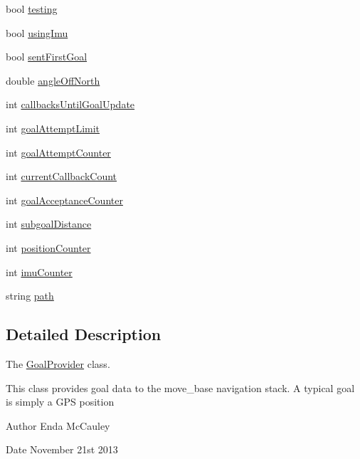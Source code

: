 \begin{DoxyCompactItemize}
\item 
bool \hyperlink{classGoalProvider_aefb932adf68011afd36e0796a001c147}{testing}
\item 
bool \hyperlink{classGoalProvider_a344bf023e320a812a824654c69531f31}{using\-Imu}
\item 
bool \hyperlink{classGoalProvider_aa576e5466ea93048ed6c231f226c9658}{sent\-First\-Goal}
\item 
double \hyperlink{classGoalProvider_a165b0eda7247ff32649b097a3e2d160a}{angle\-Off\-North}
\item 
int \hyperlink{classGoalProvider_a7ac4fe26923010d8bcb85fd50b90e259}{callbacks\-Until\-Goal\-Update}
\item 
int \hyperlink{classGoalProvider_ab63657ef75bd9c478d01b270a142103e}{goal\-Attempt\-Limit}
\item 
int \hyperlink{classGoalProvider_a35c75c0ef169d26dc40393e988f6f9ef}{goal\-Attempt\-Counter}
\item 
int \hyperlink{classGoalProvider_aca962edcdb380d56a7e551de7b5c36a6}{current\-Callback\-Count}
\item 
int \hyperlink{classGoalProvider_a27a290eb0662fbb7dc1dbe696f9fcb00}{goal\-Acceptance\-Counter}
\item 
int \hyperlink{classGoalProvider_ad4a03daf04350450ceee088c9f5f6c54}{subgoal\-Distance}
\item 
int \hyperlink{classGoalProvider_a9f314d13331aa611c5b96202742be0e9}{position\-Counter}
\item 
int \hyperlink{classGoalProvider_a1429bea432a6411c063cd3cf4990f1ca}{imu\-Counter}
\item 
string \hyperlink{classGoalProvider_a82146db14a5565a12fe979c68156d45c}{path}
\end{DoxyCompactItemize}


\subsection{\-Detailed \-Description}
\-The \hyperlink{classGoalProvider}{\-Goal\-Provider} class.

\-This class provides goal data to the move\-\_\-base navigation stack. \-A typical goal is simply a \-G\-P\-S position

\begin{DoxyAuthor}{\-Author}
\-Enda \-Mc\-Cauley 
\end{DoxyAuthor}
\begin{DoxyDate}{\-Date}
\-November 21st 2013 
\end{DoxyDate}


